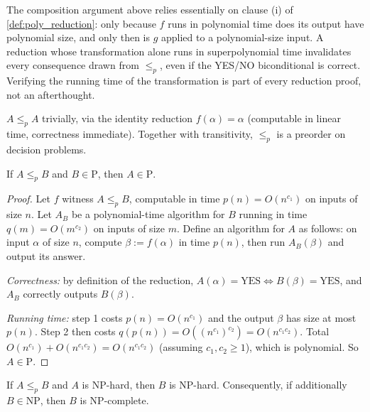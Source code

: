 \begin{remark}
The composition argument above relies essentially on clause (i) of \cref{def:poly_reduction}: only because $f$ runs in polynomial time does its output have polynomial size, and only then is $g$ applied to a polynomial-size input. A reduction whose transformation alone runs in superpolynomial time invalidates every consequence drawn from $\le_p$, even if the YES/NO biconditional is correct. Verifying the running time of the transformation is part of every reduction proof, not an afterthought.
\end{remark}

\begin{remark}[Reflexivity]
$A \le_p A$ trivially, via the identity reduction $f(\alpha) = \alpha$ (computable in linear time, correctness immediate). Together with transitivity, $\le_p$ is a preorder on decision problems.
\end{remark}

\begin{theorem}
\label{thm:reduction_preserves_p}
If $A \le_p B$ and $B \in \mathrm{P}$, then $A \in \mathrm{P}$.
\end{theorem}

\begin{proof}
Let $f$ witness $A \le_p B$, computable in time $p(n) = O(n^{c_1})$ on inputs of size $n$. Let $A_B$ be a polynomial-time algorithm for $B$ running in time $q(m) = O(m^{c_2})$ on inputs of size $m$. Define an algorithm for $A$ as follows: on input $\alpha$ of size $n$, compute $\beta := f(\alpha)$ in time $p(n)$, then run $A_B(\beta)$ and output its answer.

\emph{Correctness:} by definition of the reduction, $A(\alpha) = \text{YES} \iff B(\beta) = \text{YES}$, and $A_B$ correctly outputs $B(\beta)$.

\emph{Running time:} step 1 costs $p(n) = O(n^{c_1})$ and the output $\beta$ has size at most $p(n)$. Step 2 then costs $q(p(n)) = O((n^{c_1})^{c_2}) = O(n^{c_1 c_2})$. Total $O(n^{c_1}) + O(n^{c_1 c_2}) = O(n^{c_1 c_2})$ (assuming $c_1, c_2 \ge 1$), which is polynomial. So $A \in \mathrm{P}$.
\end{proof}

\begin{theorem}
\label{thm:np_hard_via_reduction}
If $A \le_p B$ and $A$ is NP-hard, then $B$ is NP-hard. Consequently, if additionally $B \in \mathrm{NP}$, then $B$ is NP-complete.
\end{theorem}

